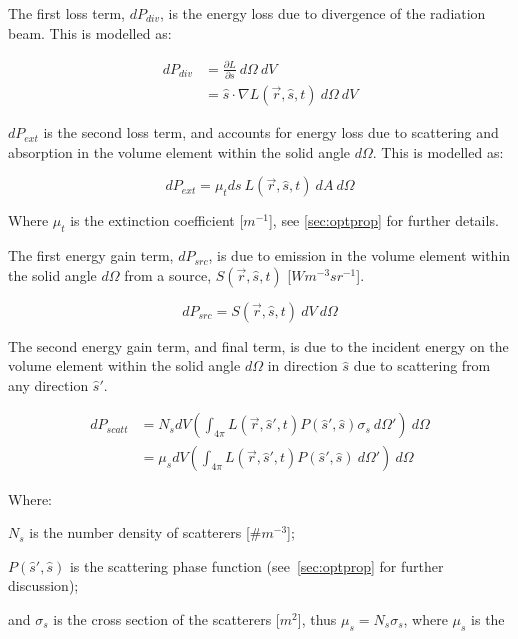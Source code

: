 The first loss term, $dP_{div}$, is the energy loss due to divergence of the radiation beam. This is modelled as:

\begin{align}
	dP_{div}&=\frac{\partial L}{\partial s}\ d\Omega\ dV \\
		    &=\hat{s} \cdot \nabla L(\vec{r},\hat{s},t)\ d\Omega\ dV
    \label{eqn:pdiv}
\end{align}

$dP_{ext}$ is the second loss term, and accounts for energy loss due to scattering and absorption in the volume element within the solid angle $d\Omega$. This is modelled as:


\begin{equation}
	dP_{ext}=\mu_t ds\ L(\vec{r},\hat{s},t)\ dA\ d\Omega
	\label{eqn:pext}
\end{equation}

Where $\mu_t$ is the extinction coefficient [$m^{-1}$], see \cref{sec:optprop} for further details.

The first energy gain term, $dP_{src}$, is due to emission in the volume element within the solid angle $d\Omega$ from a source, $S(\vec{r},\hat{s},t)$ [$Wm^{-3}sr^{-1}$]. 

\begin{equation}
	dP_{src}=S(\vec{r},\hat{s},t)\ dV\ d\Omega
	\label{eqn:psrc}
\end{equation}

The second energy gain term, and final term, is due to the incident energy on the volume element within the solid angle $d\Omega$ in direction $\hat{s}$ due to scattering from any direction $\hat{s}'$.

\begin{align}
	dP_{scatt}&=N_sdV\left(\int_{4\pi}L(\vec{r},\hat{s}',t)P(\hat{s}',\hat{s})\sigma_s\ d\Omega' \right)\ d\Omega \\
			  &=\mu_sdV\left(\int_{4\pi}L(\vec{r},\hat{s}',t)P(\hat{s}',\hat{s})\ d\Omega' \right)\ d\Omega 
			  \label{eqn:pscatt}
\end{align}

\noindent Where:

\indent $N_s$ is the number density of scatterers [$\#m^{-3}$];

\indent $P(\hat{s}',\hat{s})$ is the scattering phase function (see~\cref{sec:optprop} for further discussion);

\indent and $\sigma_s$ is the cross section of the scatterers [$m^2$], thus $\mu_s=N_s\sigma_s$, where $\mu_s$ is the 

